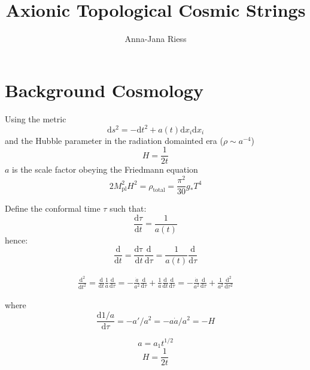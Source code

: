 \documentclass[a4paper]{article}
\begin{document}
	
\title{Axionic Topological Cosmic Strings}
\author{Anna-Jana Riess}

\maketitle

\section{Background Cosmology}
Using the metric
\begin{equation}
    \mathrm{d}s^2 = -\mathrm{d}t^2 + a(t) \mathrm{d} x_i \mathrm{d} x_i
\end{equation}
and the Hubble parameter in the radiation domainted era ($\rho \sim a^{-4}$)
\begin{equation}
    H = \frac{1}{2t}
\end{equation}
$a$ is the scale factor obeying the Friedmann equation
\begin{equation}
    2 M_\mathrm{pl}^2 H^2 = \rho_\mathrm{total} = \frac{\pi^2}{30} g_* T^4
\end{equation}

Define the conformal time $\tau$ such that:
\begin{equation}
    \frac{\mathrm{d} \tau}{\mathrm{d} t} = \frac{1}{a(t)}
\end{equation}
hence:
\begin{equation}
    \frac{\mathrm{d}}{\mathrm{d} t} = \frac{\mathrm{d \tau}}{\mathrm{d} t} \frac{\mathrm{d}}{\mathrm{d} \tau} = \frac{1}{a(t)} \frac{\mathrm{d}}{\mathrm{d} \tau}
\end{equation}

\begin{align}
    \frac{\mathrm{d}^2}{\mathrm{d} t^2} = \frac{\mathrm{d}}{\mathrm{d} t} \frac{1}{a} \frac{\mathrm{d}}{\mathrm{d} \tau}
    = - \frac{\dot{a}}{a^2} \frac{\mathrm{d}}{\mathrm{d} \tau} + \frac{1}{a} \frac{\mathrm{d}}{\mathrm{d} t} \frac{\mathrm{d}}{\mathrm{d} \tau}
     = - \frac{\dot{a}}{a^2} \frac{\mathrm{d}}{\mathrm{d} \tau} + \frac{1}{a^2} \frac{\mathrm{d}^2}{\mathrm{d} \tau^2}
\end{align}

where
\begin{equation}
    \frac{\mathrm{d} 1/a}{\mathrm{d} \tau} = - a' / a^2 = - a \dot{a} / a^2 = - H
\end{equation}

\begin{equation}
    a = a_1 t^{1/2}
\end{equation}
\begin{equation}
    H = \frac{1}{2t}
\end{equation}
\end{document}
